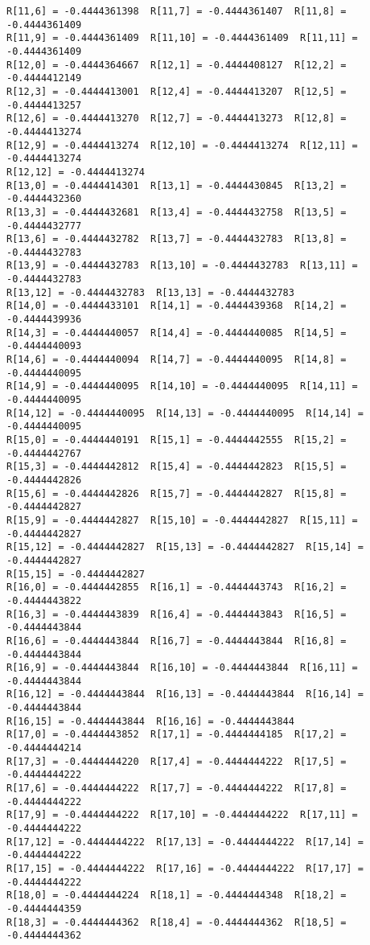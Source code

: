 \documentclass[11pt]{article}
\begin{document}
\begin{Verbatim}[commandchars=\\\{\}]
R[11,6] = -0.4444361398  R[11,7] = -0.4444361407  R[11,8] = -0.4444361409
R[11,9] = -0.4444361409  R[11,10] = -0.4444361409  R[11,11] = -0.4444361409
R[12,0] = -0.4444364667  R[12,1] = -0.4444408127  R[12,2] = -0.4444412149
R[12,3] = -0.4444413001  R[12,4] = -0.4444413207  R[12,5] = -0.4444413257
R[12,6] = -0.4444413270  R[12,7] = -0.4444413273  R[12,8] = -0.4444413274
R[12,9] = -0.4444413274  R[12,10] = -0.4444413274  R[12,11] = -0.4444413274
R[12,12] = -0.4444413274
R[13,0] = -0.4444414301  R[13,1] = -0.4444430845  R[13,2] = -0.4444432360
R[13,3] = -0.4444432681  R[13,4] = -0.4444432758  R[13,5] = -0.4444432777
R[13,6] = -0.4444432782  R[13,7] = -0.4444432783  R[13,8] = -0.4444432783
R[13,9] = -0.4444432783  R[13,10] = -0.4444432783  R[13,11] = -0.4444432783
R[13,12] = -0.4444432783  R[13,13] = -0.4444432783
R[14,0] = -0.4444433101  R[14,1] = -0.4444439368  R[14,2] = -0.4444439936
R[14,3] = -0.4444440057  R[14,4] = -0.4444440085  R[14,5] = -0.4444440093
R[14,6] = -0.4444440094  R[14,7] = -0.4444440095  R[14,8] = -0.4444440095
R[14,9] = -0.4444440095  R[14,10] = -0.4444440095  R[14,11] = -0.4444440095
R[14,12] = -0.4444440095  R[14,13] = -0.4444440095  R[14,14] = -0.4444440095
R[15,0] = -0.4444440191  R[15,1] = -0.4444442555  R[15,2] = -0.4444442767
R[15,3] = -0.4444442812  R[15,4] = -0.4444442823  R[15,5] = -0.4444442826
R[15,6] = -0.4444442826  R[15,7] = -0.4444442827  R[15,8] = -0.4444442827
R[15,9] = -0.4444442827  R[15,10] = -0.4444442827  R[15,11] = -0.4444442827
R[15,12] = -0.4444442827  R[15,13] = -0.4444442827  R[15,14] = -0.4444442827
R[15,15] = -0.4444442827
R[16,0] = -0.4444442855  R[16,1] = -0.4444443743  R[16,2] = -0.4444443822
R[16,3] = -0.4444443839  R[16,4] = -0.4444443843  R[16,5] = -0.4444443844
R[16,6] = -0.4444443844  R[16,7] = -0.4444443844  R[16,8] = -0.4444443844
R[16,9] = -0.4444443844  R[16,10] = -0.4444443844  R[16,11] = -0.4444443844
R[16,12] = -0.4444443844  R[16,13] = -0.4444443844  R[16,14] = -0.4444443844
R[16,15] = -0.4444443844  R[16,16] = -0.4444443844
R[17,0] = -0.4444443852  R[17,1] = -0.4444444185  R[17,2] = -0.4444444214
R[17,3] = -0.4444444220  R[17,4] = -0.4444444222  R[17,5] = -0.4444444222
R[17,6] = -0.4444444222  R[17,7] = -0.4444444222  R[17,8] = -0.4444444222
R[17,9] = -0.4444444222  R[17,10] = -0.4444444222  R[17,11] = -0.4444444222
R[17,12] = -0.4444444222  R[17,13] = -0.4444444222  R[17,14] = -0.4444444222
R[17,15] = -0.4444444222  R[17,16] = -0.4444444222  R[17,17] = -0.4444444222
R[18,0] = -0.4444444224  R[18,1] = -0.4444444348  R[18,2] = -0.4444444359
R[18,3] = -0.4444444362  R[18,4] = -0.4444444362  R[18,5] = -0.4444444362

\end{Verbatim}
\end{document}
